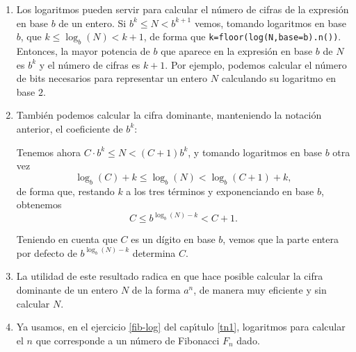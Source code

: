 \begin{enumerate}
 \item Los logaritmos pueden servir para calcular el n\'umero de cifras de la
expresi\'on en base $b$ de un entero. Si 
 $b^k\le N<b^{k+1}$ vemos, tomando logaritmos en base $b$, que $k \le \log_b(N)
<
k+1$, de forma que \lstinline|k=floor(log(N,base=b).n())|. Entonces, la mayor
potencia de $b$ que aparece en la expresi\'on en base $b$ de $N$ es $b^k$ y el
n\'umero de cifras es $k+1$. Por ejemplo, podemos calcular el n\'umero de bits
necesarios para representar un entero $N$ calculando su logaritmo en base $2$.

 \item Tambi\'en podemos calcular la cifra dominante, manteniendo la notaci\'on
anterior, el coeficiente de $b^k$: 

Tenemos ahora $C\cdot b^k\le N<(C+1)b^k$, y tomando logaritmos en base $b$ otra
vez 
\[\log_b(C)+k\le \log_b(N)< \log_b(C+1)+k,\]
\noindent de forma que, restando $k$ a los tres t\'erminos y exponenciando en
base $b$, obtenemos
\[C\le b^{\log_b(N)-k}<C+1.\]

Teniendo en cuenta que $C$ es un d\'{i}gito en base $b$, 
vemos que la parte entera por defecto de  $b^{\log_b(N)-k}$ determina $C$.
 \item La utilidad de este resultado radica en que hace posible calcular 
 la cifra dominante de un entero $N$ de la forma $a^ n$, de manera muy eficiente y  sin calcular $N$. 
 \item Ya usamos, en el ejercicio \ref{fib-log} del cap\'{\i}tulo \ref{tn1},
logaritmos para calcular el $n$ que corresponde a un n\'umero de Fibonacci $F_n$
dado.
 
\end{enumerate}


